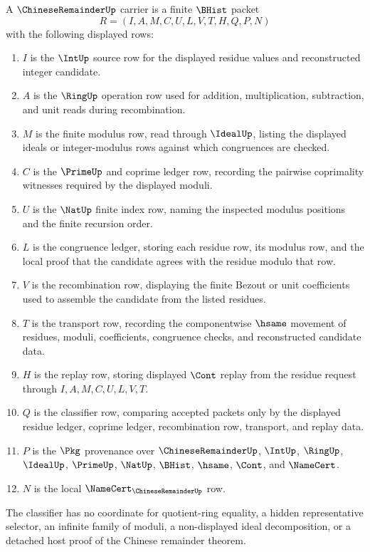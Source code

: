\begin{definition}
\label{def:chinese-remainder-carrier}
A $\ChineseRemainderUp$ carrier is a finite $\BHist$ packet
$$
R=(I,A,M,C,U,L,V,T,H,Q,P,N)
$$
with the following displayed rows:
\begin{enumerate}
\item $I$ is the $\IntUp$ source row for the displayed residue values and reconstructed integer candidate.
\item $A$ is the $\RingUp$ operation row used for addition, multiplication, subtraction, and unit reads during recombination.
\item $M$ is the finite modulus row, read through $\IdealUp$, listing the displayed ideals or integer-modulus rows against which congruences are checked.
\item $C$ is the $\PrimeUp$ and coprime ledger row, recording the pairwise coprimality witnesses required by the displayed moduli.
\item $U$ is the $\NatUp$ finite index row, naming the inspected modulus positions and the finite recursion order.
\item $L$ is the congruence ledger, storing each residue row, its modulus row, and the local proof that the candidate agrees with the residue modulo that row.
\item $V$ is the recombination row, displaying the finite Bezout or unit coefficients used to assemble the candidate from the listed residues.
\item $T$ is the transport row, recording the componentwise $\hsame$ movement of residues, moduli, coefficients, congruence checks, and reconstructed candidate data.
\item $H$ is the replay row, storing displayed $\Cont$ replay from the residue request through $I,A,M,C,U,L,V,T$.
\item $Q$ is the classifier row, comparing accepted packets only by the displayed residue ledger, coprime ledger, recombination row, transport, and replay data.
\item $P$ is the $\Pkg$ provenance over $\ChineseRemainderUp$, $\IntUp$, $\RingUp$, $\IdealUp$, $\PrimeUp$, $\NatUp$, $\BHist$, $\hsame$, $\Cont$, and $\NameCert$.
\item $N$ is the local $\NameCert_{\ChineseRemainderUp}$ row.
\end{enumerate}
The classifier has no coordinate for quotient-ring equality, a hidden representative selector, an infinite family of moduli, a non-displayed ideal decomposition, or a detached host proof of the Chinese remainder theorem.
\end{definition}

